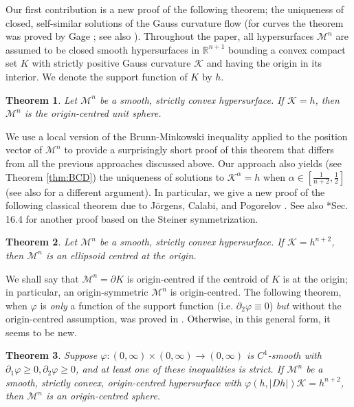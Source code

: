 \documentclass[12pt]{amsart}
\newtheorem{theorem}{Theorem}[section]
\theoremstyle{definition}
\numberwithin{equation}{section}
\newcommand{\M}{\mathcal{M}}
\theoremstyle{remark}
\numberwithin{equation}{section}
\begin{document}
Our first contribution is a new proof of the following theorem; the uniqueness of closed, self-similar solutions of the Gauss curvature flow (for curves the theorem was proved by Gage \cites{Gag84}; see also \cite{And03}). Throughout the paper, all hypersurfaces $\M^n$ are assumed to be closed smooth hypersurfaces in $\mathbb{R}^{n+1}$ bounding a convex compact set $K$ with strictly positive Gauss curvature $\mathcal{K}$ and having the origin in its interior. We denote the support function of $K$ by $h$.  

\begin{theorem}\label{An+BCD}\cites{Gag84,And99,CD16}
Let $\M^n$ be a smooth, strictly convex hypersurface. %
If $\mathcal{K}=h$, then $\M^n$ is the origin-centred unit sphere.
\end{theorem}
We use a local version of the Brunn-Minkowski inequality applied to the position vector of $\M^n$ to provide a surprisingly short proof of this theorem that differs from all the previous approaches discussed above. Our approach also yields (see Theorem \ref{thm:BCD}) the uniqueness of solutions to $\mathcal{K}^{\alpha}=h$ when $\alpha\in [\frac{1}{n+2},\frac{1}{2}]$ (see also \cites{BCD17} for a different argument). In particular, we give a new proof of the following classical theorem due to J\"{o}rgens, Calabi, and Pogorelov \cites{Jor54, Cal58,Pog72,CY86}. See also \cite{ACGL20}*{Sec. 16.4} for another proof based on the Steiner symmetrization.

\begin{theorem}\label{Calabi}
Let $\M^n$ be a smooth, strictly convex hypersurface. If $\mathcal{K}=h^{n+2}$, then $\M^n$ is an ellipsoid centred at the origin.
\end{theorem}

We shall say that $\M^n = \partial K$ is origin-centred if the centroid of $K$ is at the origin; in particular, an origin-symmetric $\M^n$ is origin-centred. The following theorem, when $\varphi$ is \emph{only} a function of the support function (i.e. $\partial_2 \varphi \equiv 0$) \emph{but} without the origin-centred assumption, was proved in \cite{Sar22}. Otherwise, in this general form, it seems to be new.

\begin{theorem}\label{gen of Saroglou}
Suppose $\varphi: (0,\infty)\times (0,\infty)\to (0,\infty)$ is $C^1$-smooth with $\partial_1\varphi\geq 0, \partial_2\varphi\geq 0$, and at least one of these inequalities is strict. If $\M^n$ be a smooth, strictly convex, origin-centred hypersurface with $\varphi(h,|Dh|)\mathcal{K}=h^{n+2}$, then $\M^n$ is an origin-centred sphere. 
\end{theorem}
\end{document}
